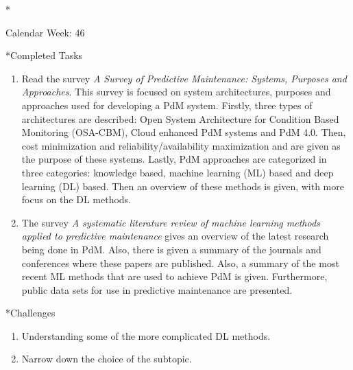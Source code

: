 \documentclass[11pt,a4paper]{article}
\begin{document}
\newpage
\begin{section}*{Calendar Week: 46 \hfill \date{13 November, 2020}}
 \begin{refsection}

       \begin{subsection}*{Completed Tasks}
             \begin{enumerate}
                   \item
                         Read the survey \emph{A Survey of Predictive Maintenance: Systems, Purposes and Approaches}.
                         This survey is focused on system architectures, purposes and approaches used for developing
                         a PdM system. Firstly, three types of architectures are described: Open System Architecture
                         for Condition Based Monitoring (OSA-CBM), Cloud enhanced PdM systems and PdM 4.0. Then,
                         cost minimization and reliability/availability maximization and are given as the purpose
                         of these systems. Lastly, PdM approaches are categorized in three categories: knowledge
                         based, machine learning (ML) based and deep learning (DL) based. Then an overview of
                         these methods is given, with more focus on the DL methods.
                         \cite{DBLP:journals/corr/abs-1912-07383}
                   \item
                         The survey \emph{A systematic literature review of machine learning methods applied to predictive
                               maintenance} gives an overview of the latest research being done in PdM. Also, there is given a
                         summary of the journals and conferences where these papers are published. Also, a summary of the
                         most recent ML methods that are used to achieve PdM is given. Furthermore, public data sets
                         for use in predictive maintenance are presented.   \cite{DBLP:journals/candie/CarvalhoSVFBA19}
             \end{enumerate}
       \end{subsection}

       \begin{subsection}*{Challenges}
             \begin{enumerate}
                   \item
                         Understanding some of the more complicated DL methods.
                   \item
                         Narrow down the choice of the subtopic.
             \end{enumerate}
       \end{subsection}


\end{refsection}
\end{section}
\end{document}
